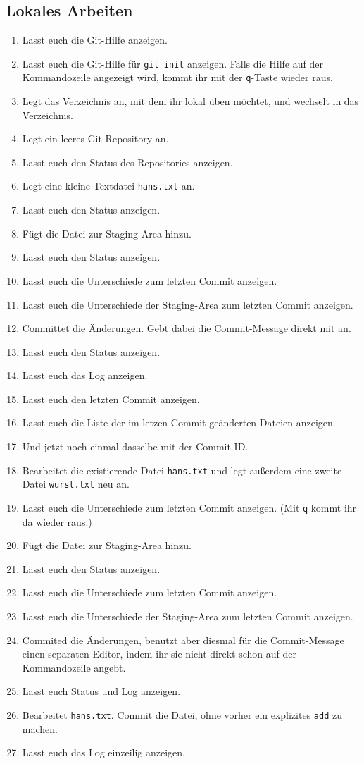 \documentclass[a4paper,12pt]{scrartcl}
\begin{document}
\subsection{Lokales Arbeiten}

\begin{enumerate}
  \item Lasst euch die Git-Hilfe anzeigen.
  \item Lasst euch die Git-Hilfe für \texttt{git init} anzeigen. Falls die Hilfe auf der Kommandozeile angezeigt wird, kommt ihr mit der \texttt{q}-Taste wieder raus.
  \item Legt das Verzeichnis an, mit dem ihr lokal üben möchtet, und wechselt in das Verzeichnis.
  \item Legt ein leeres Git-Repository an.
  \item Lasst euch den Status des Repositories anzeigen.
  \item Legt eine kleine Textdatei \texttt{hans.txt} an.
  \item Lasst euch den Status anzeigen.
  \item Fügt die Datei zur Staging-Area hinzu.
  \item Lasst euch den Status anzeigen.
  \item Lasst euch die Unterschiede zum letzten Commit anzeigen.
  \item Lasst euch die Unterschiede der Staging-Area zum letzten Commit anzeigen.
  \item Committet die Änderungen. Gebt dabei die Commit-Message direkt mit an.
  \item Lasst euch den Status anzeigen.
  \item Lasst euch das Log anzeigen.
  \item Lasst euch den letzten Commit anzeigen.
  \item Lasst euch die Liste der im letzen Commit geänderten Dateien anzeigen.
  \item Und jetzt noch einmal dasselbe mit der Commit-ID.
  \item Bearbeitet die existierende Datei \texttt{hans.txt} und legt außerdem eine zweite Datei \texttt{wurst.txt} neu an.
  \item Lasst euch die Unterschiede zum letzten Commit anzeigen. (Mit \texttt{q} kommt ihr da wieder raus.)
  \item Fügt die Datei zur Staging-Area hinzu.
  \item Lasst euch den Status anzeigen.
  \item Lasst euch die Unterschiede zum letzten Commit anzeigen.
  \item Lasst euch die Unterschiede der Staging-Area zum letzten Commit anzeigen.
  \item Commited die Änderungen, benutzt aber diesmal für die Commit-Message einen separaten Editor, indem ihr sie nicht direkt schon auf der Kommandozeile angebt.
  \item Lasst euch Status und Log anzeigen.
  \item Bearbeitet \texttt{hans.txt}. Commit die Datei, ohne vorher ein explizites \texttt{add} zu machen.
  \item Lasst euch das Log einzeilig anzeigen.
\end{enumerate}
\end{document}
